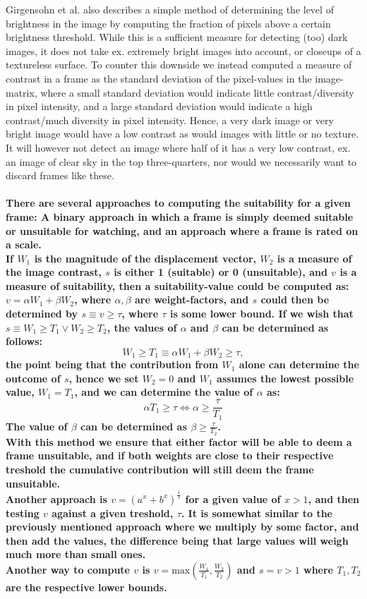 \documentclass[12pt]{article}
\begin{document}
Girgensohn et al. \cite{Girgensohn:2000:SAH:354401.354415} also describes a simple method of determining the level of brightness in the image by computing the fraction of pixels above a certain brightness threshold. While this is a sufficient measure for detecting (too) dark images, it does not take ex. extremely bright images into account, or closeups of a textureless surface. To counter this downside we instead computed a measure of contrast in a frame as the standard deviation of the pixel-values in the image-matrix, where a small standard deviation would indicate little contrast/diversity in pixel intensity, and a large standard deviation would indicate a high contrast/much diversity in pixel intensity. Hence, a very dark image or very bright image would have a low contrast as would images with little or no texture. It will however not detect an image where half of it has a very low contrast, ex. an image of clear sky in the top three-quarters, nor would we necessarily want to discard frames like these.\\\\ %
%
\textbf{There are several approaches to computing the suitability for a given frame: A binary approach in which a frame is simply deemed suitable or unsuitable for watching, and an approach where a frame is rated on a scale.\\
If $W_{1}$ is the magnitude of the displacement vector, $W_{2}$ is a measure of the image contrast, $s$ is either 1 (suitable) or 0 (unsuitable), and $v$ is a measure of suitability, then a suitability-value could be computed as: $v = \alpha W_{1} + \beta W_{2}$, where $\alpha,\beta$ are weight-factors, and $s$ could then be determined by $s \equiv v \ge \tau$, where $\tau$ is some lower bound. If we wish that $s \equiv W_{1} \ge T_{1} \vee W_{2} \ge T_{2}$, the values of $\alpha$ and $\beta$ can be determined as follows:
%
\[
W_{1} \ge T_{1} \equiv \alpha W_{1} + \beta W_{2} \ge \tau,
\]
%
the point being that the contribution from $W_{1}$ alone can determine the outcome of $s$, hence we set $W_{2} = 0$ and $W_{1}$ assumes the lowest possible value, $W_{1} = T_{1}$, and we can determine the value of $\alpha$ as:
%
\[
\alpha T_{1} \ge \tau \Leftrightarrow \alpha \ge \frac{\tau}{T_{1}}
\]
%
The value of $\beta$ can be determined as $\beta \ge \frac{\tau}{T_{2}}$.\\
With this method we ensure that either factor will be able to deem a frame unsuitable, and if both weights are close to their respective treshold the cumulative contribution will still deem the frame unsuitable.\\
Another approach is $v = (a^x + b^x)^{\frac{1}{x}}$ for a given value of $x > 1$, and then testing $v$ against a given treshold, $\tau$. It is somewhat similar to the previously mentioned approach where we multiply by some factor, and then add the values, the difference being that large values will weigh much more than small ones.
\\
%
Another way to compute $v$ is $v = \text{max}(\frac{W_{1}}{T_{1}}, \frac{W_{2}}{T_{2}})$ and $s = v >1$ where $T_{1}, T_{2}$ are the respective lower bounds.}
%
\end{document}
